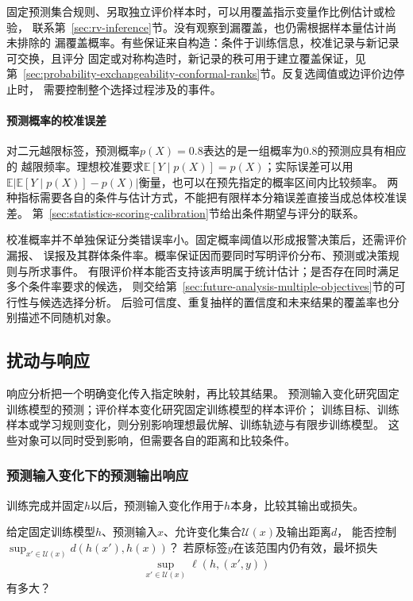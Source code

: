 固定预测集合规则、另取独立评价样本时，可以用覆盖指示变量作比例估计或检验，
联系第~\ref{sec:rv-inference}节。没有观察到漏覆盖，也仍需根据样本量估计尚未排除的
漏覆盖概率。有些保证来自构造：条件于训练信息，校准记录与新记录可交换，且评分
固定或对称构造时，新记录的秩可用于建立覆盖保证，见
第~\ref{sec:probability-exchangeability-conformal-ranks}节。反复选阈值或边评价边停止时，
需要控制整个选择过程涉及的事件。

\paragraph{预测概率的校准误差}

对二元越限标签，预测概率$p(X)=0.8$表达的是一组概率为$0.8$的预测应具有相应的
越限频率。理想校准要求$\mathbb E[Y\mid p(X)]=p(X)$；实际误差可以用
$\mathbb E|\mathbb E[Y\mid p(X)]-p(X)|$衡量，也可以在预先指定的概率区间内比较频率。
两种指标需要各自的条件与估计方式，不能把有限样本分箱误差直接当成总体校准误差。
第~\ref{sec:statistics-scoring-calibration}节给出条件期望与评分的联系。

校准概率并不单独保证分类错误率小。固定概率阈值以形成报警决策后，还需评价漏报、
误报及其群体条件率。概率保证因而要同时写明评价分布、预测或决策规则与所求事件。
有限评价样本能否支持该声明属于统计估计；是否存在同时满足多个条件率要求的候选，
则交给第~\ref{sec:future-analysis-multiple-objectives}节的可行性与候选选择分析。
后验可信度、重复抽样的置信度和未来结果的覆盖率也分别描述不同随机对象。

\subsection{扰动与响应}
\label{sec:future-robustness-security-map}
\label{sec:future-privacy-unlearning-map}

响应分析把一个明确变化传入指定映射，再比较其结果。
预测输入变化研究固定训练模型的预测；评价样本变化研究固定训练模型的样本评价；
训练目标、训练样本或学习规则变化，则分别影响理想最优解、训练轨迹与有限步训练模型。
这些对象可以同时受到影响，但需要各自的距离和比较条件。

\subsubsection{预测输入变化下的预测输出响应}
\label{sec:future-analysis-robustness}

训练完成并固定$h$以后，预测输入变化作用于$h$本身，比较其输出或损失。

\begin{mathproblem}[预测输入扰动的输出与损失响应]
  \label{question:future-robustness}
  给定固定训练模型$h$、预测输入$x$、允许变化集合$\mathcal U(x)$及输出距离$d$，
  能否控制$\sup_{x'\in\mathcal U(x)}d(h(x'),h(x))$？
  若原标签$y$在该范围内仍有效，最坏损失
  \[
    \sup_{x'\in\mathcal U(x)}\ell(h,(x',y))
  \]
  有多大？
\end{mathproblem}

